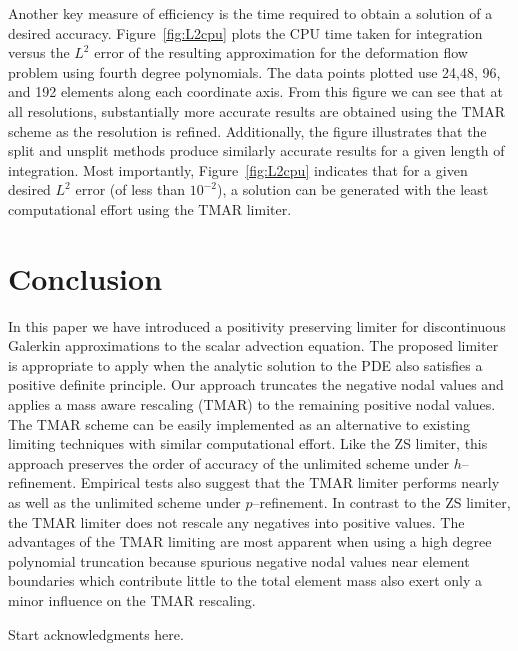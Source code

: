 \documentclass{ametsoc}
\begin{document}
Another key measure of efficiency is the time required to obtain a solution of a desired accuracy. Figure~\ref{fig:L2cpu} plots the CPU time taken for integration versus the $L^2$ error of the resulting approximation for the deformation flow problem using fourth degree polynomials. The data points plotted use 24,48, 96, and 192 elements along each coordinate axis. From this figure we can see that at all resolutions, substantially more accurate results are obtained using the TMAR scheme as the resolution is refined. Additionally, the figure illustrates that the split and unsplit methods produce similarly accurate results for a given length of integration. Most importantly, Figure~\ref{fig:L2cpu} indicates that for a given desired $L^2$ error (of less than $10^{-2}$), a solution can be generated with the least computational effort using the TMAR limiter. 

\section{Conclusion} \label{sec:conc}
In this paper we have introduced a positivity preserving limiter for discontinuous Galerkin approximations to the scalar advection equation. The proposed limiter is appropriate to apply when the analytic solution to the PDE also satisfies a positive definite principle. Our approach truncates the negative nodal values and applies a mass aware rescaling (TMAR) to the remaining positive nodal values. The TMAR scheme can be easily implemented as an alternative to existing limiting techniques with similar computational effort. Like the ZS limiter, this approach preserves the order of accuracy of the unlimited scheme under $h$--refinement. Empirical tests also suggest that the TMAR limiter performs nearly as well as the unlimited scheme under $p$--refinement. In contrast to the ZS limiter, the TMAR limiter does not rescale any negatives into positive values. The advantages of the TMAR limiting are most apparent when using a high degree polynomial truncation because spurious negative nodal values near element boundaries which contribute little to the total element mass also exert only a minor influence on the TMAR rescaling.

%
\acknowledgments
Start acknowledgments here.

%
\end{document}
